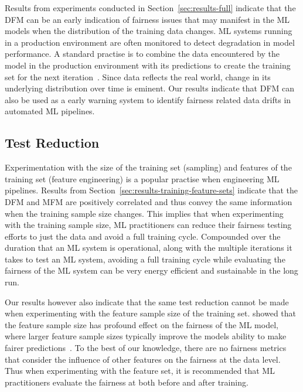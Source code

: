\documentclass{article}
\begin{document}
Results from experiments conducted in Section \ref{sec:results-full}
indicate that the DFM can be an early indication of fairness issues
that may manifest in the ML models when the distribution of the
training data changes. ML systems running in a production environment
are often monitored to detect degradation in model performance. A
standard practise is to combine the data encountered by the model in
the production environment with its predictions to create the training
set for the next
iteration \cite{biessmann2021automated,breck2019data,schelter2018automating}.
Since data reflects the real world, change in its underlying
distribution over time is eminent. Our results indicate that DFM can
also be used as a early warning system to identify fairness related
data drifts in automated ML pipelines.

\subsection{Test Reduction}\label{sec:discuss-test-red}

Experimentation with the size of the training set (sampling) and
features of the training set (feature engineering) is a popular
practise when engineering ML pipelines. Results from
Section \ref{sec:results-training-feature-sets} indicate that the DFM
and MFM are positively correlated and thus convey the same information
when the training sample size changes. This implies that when
experimenting with the training sample size, ML practitioners can
reduce their fairness testing efforts to just the data and avoid a
full training cycle. Compounded over the duration that an ML system is
operational, along with the multiple iterations it takes to test an ML
system, avoiding a full training cycle while evaluating the fairness
of the ML system can be very energy efficient and sustainable in the
long run.


Our results however also indicate that the same test reduction cannot
be made when experimenting with the feature sample size of the
training set. \citeauthor{zhang2021ignorance} showed that the feature
sample size has profound effect on the fairness of the ML model, where
larger feature sample sizes typically improve the models ability to
make fairer predictions \cite{zhang2021ignorance}. To the best of our
knowledge, there are no fairness metrics that consider the influence
of other features on the fairness at the data level. Thus when
experimenting with the feature set, it is recommended that ML
practitioners evaluate the fairness at both before and after training.
\end{document}
